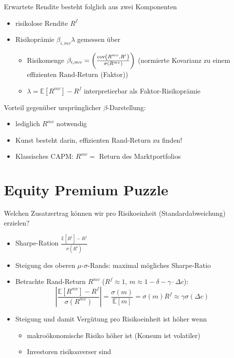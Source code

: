 \documentclass[12pt]{extreport} %
\theoremstyle{named}
\theoremstyle{nnamed}
\theoremstyle{itshape}
\theoremstyle{normal}
\begin{document}
Erwartete Rendite besteht folglich aus zwei Komponenten
\begin{itemize}
	\item risikolose Rendite $R^f$
	\item Risikoprämie $\beta_{i,mv} \lambda$ gemessen über
	\begin{itemize}
		\item Risikomenge $\beta_{i,mv} = \left( \frac{\operatorname{cov} \left( R^{mv}, R^i \right)}{\sigma \left( R^{mv} \right)} \right)$ (normierte Kovarianz zu einem effizienten Rand-Return (Faktor))
		\item $\lambda = \mathbb{E} \left[ R^{mv} \right] - R^f$ interpretierbar als Faktor-Risikoprämie
	\end{itemize}
\end{itemize}
Vorteil gegenüber ursprünglicher $\beta$-Darstellung:
\begin{itemize}
	\item lediglich $R^{mv}$ notwendig
	\item Kunst besteht darin, effizienten Rand-Return zu finden!
	\item Klassisches CAPM: $R^{mv} =$ Return des Marktportfolios
\end{itemize}

\section{Equity Premium Puzzle}

Welchen Zusatzertrag können wir pro Risikoeinheit (Standardabweichung) erzielen?
\begin{itemize}
	\item Sharpe-Ration $\frac{\mathbb{E}[R^i] - R^f}{\sigma(R^i)}$
	\item Steigung des oberen $\mu$-$\sigma$-Rands: maximal mögliches Sharpe-Ratio
	\item Betrachte Rand-Return $R^{mv}$ ($R^f \approx 1$, $m \approx 1 - \delta - \gamma \cdot \Delta c$):
		$$ \left| \frac{\mathbb{E}[R^{mv}] - R^f}{\sigma(R^{mv})} \right| = \frac{\sigma(m)}{\mathbb{E}[m]} = \sigma(m) R^f \approx \gamma \sigma(\Delta c) $$
	\item Steigung und damit Vergütung pro Risikoeinheit ist höher wenn
		\begin{itemize}
			\item makroökonomische Risiko höher ist (Konsum ist volatiler)
			\item Investoren risikoaverser sind
		\end{itemize}
\end{itemize}
\end{document}
